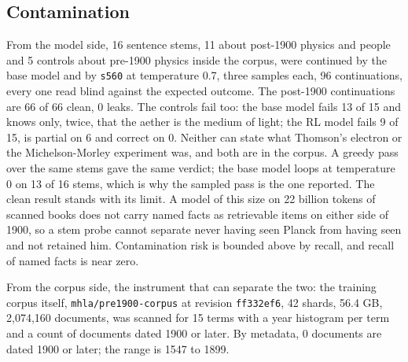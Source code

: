 \documentclass[reprint,prx,amsmath,amssymb,aps,superscriptaddress]{revtex4-2}
\begin{document}
\subsection{Contamination}

From the model side, 16 sentence stems, 11 about post-1900 physics and people and 5 controls about pre-1900 physics inside the corpus, were continued by the base model and by \texttt{s560} at temperature 0.7, three samples each, 96 continuations, every one read blind against the expected outcome. The post-1900 continuations are 66 of 66 clean, 0 leaks. The controls fail too: the base model fails 13 of 15 and knows only, twice, that the aether is the medium of light; the RL model fails 9 of 15, is partial on 6 and correct on 0. Neither can state what Thomson's electron or the Michelson-Morley experiment was, and both are in the corpus. A greedy pass over the same stems gave the same verdict; the base model loops at temperature 0 on 13 of 16 stems, which is why the sampled pass is the one reported. The clean result stands with its limit. A model of this size on 22 billion tokens of scanned books does not carry named facts as retrievable items on either side of 1900, so a stem probe cannot separate never having seen Planck from having seen and not retained him. Contamination risk is bounded above by recall, and recall of named facts is near zero.

From the corpus side, the instrument that can separate the two: the training corpus itself, \texttt{mhla/pre1900-corpus} at revision \texttt{ff332ef6}, 42 shards, 56.4 GB, 2,074,160 documents, was scanned for 15 terms with a year histogram per term and a count of documents dated 1900 or later. By metadata, 0 documents are dated 1900 or later; the range is 1547 to 1899.
\end{document}
